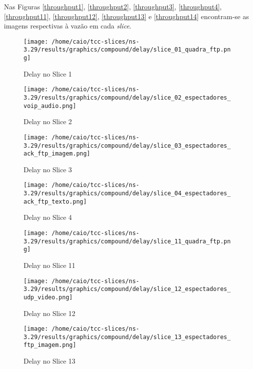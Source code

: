 \documentclass[12pt, a4paper]{article}
\begin{document}
Nas Figuras \ref{throughput1}, \ref{throughput2}, \ref{throughput3}, \ref{throughput4}, \ref{throughput11}, \ref{throughput12}, \ref{throughput13} e \ref{throughput14} encontram-se as imagens respectivas à vazão em cada \textit{slice}.

\begin{figure}[H]
	\centering
	\texttt{[image: /home/caio/tcc-slices/ns-3.29/results/graphics/compound/delay/slice\_01\_quadra\_ftp.png]}
	\caption{Delay no Slice 1}
	\label{delay1}
\end{figure}

\begin{figure}[H]
	\centering
	\texttt{[image: /home/caio/tcc-slices/ns-3.29/results/graphics/compound/delay/slice\_02\_espectadores\_voip\_audio.png]}
	\caption{Delay no Slice 2}
	\label{delay2}
\end{figure}

\begin{figure}[H]
	\centering
	\texttt{[image: /home/caio/tcc-slices/ns-3.29/results/graphics/compound/delay/slice\_03\_espectadores\_ack\_ftp\_imagem.png]}
	\caption{Delay no Slice 3}
	\label{delay3}
\end{figure}

\begin{figure}[H]
	\centering
	\texttt{[image: /home/caio/tcc-slices/ns-3.29/results/graphics/compound/delay/slice\_04\_espectadores\_ack\_ftp\_texto.png]}
	\caption{Delay no Slice 4}
	\label{delay4}
\end{figure}

\begin{figure}[H]
	\centering
	\texttt{[image: /home/caio/tcc-slices/ns-3.29/results/graphics/compound/delay/slice\_11\_quadra\_ftp.png]}
	\caption{Delay no Slice 11}
	\label{delay11}
\end{figure}

\begin{figure}[H]
	\centering
	\texttt{[image: /home/caio/tcc-slices/ns-3.29/results/graphics/compound/delay/slice\_12\_espectadores\_udp\_video.png]}
	\caption{Delay no Slice 12}
	\label{delay12}
\end{figure}

\begin{figure}[H]
	\centering
	\texttt{[image: /home/caio/tcc-slices/ns-3.29/results/graphics/compound/delay/slice\_13\_espectadores\_ftp\_imagem.png]}
	\caption{Delay no Slice 13}
	\label{delay13}
\end{figure}
\end{document}
